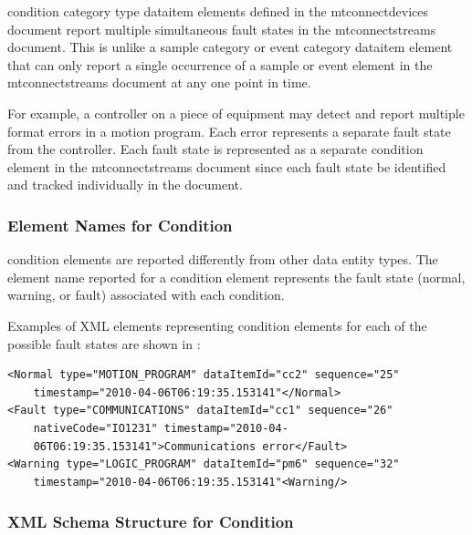 

\gls{condition category} type \gls{dataitem} elements defined in the \gls{mtconnectdevices} document \may report multiple simultaneous \glspl{fault state} in the \gls{mtconnectstreams} document.  This is unlike a \gls{sample category} or \gls{event category} \gls{dataitem} element that can only report a single occurrence of a \gls{sample} or \gls{event} element in the \gls{mtconnectstreams} document at any one point in time.

For example, a controller on a piece of equipment may detect and report multiple format errors in a motion program.   Each error represents a separate \gls{fault state} from the controller.   Each \gls{fault state} is represented as a separate \gls{condition} element in the \gls{mtconnectstreams} document since each \gls{fault state} \must be identified and tracked individually in the document.

\subsubsection{Element Names for Condition}\label{sec:Element Names for Condition}

\gls{condition} elements are reported differently from other \gls{data entity} \glspl{type}.  The \gls{element name} reported for a \gls{condition} element represents the \gls{fault state} (\gls{normal}, \gls{warning}, or \gls{fault}) associated with each \gls{condition}.

Examples of XML elements representing \gls{condition} elements for each of the possible \glspl{fault state} are shown in :

\begin{lstlisting}[firstnumber=1,escapechar=|,%
    caption={Example of Condition Element Fault States},label={lst:example-of-condition-element-fault-states}]
<Normal type="MOTION_PROGRAM" dataItemId="cc2" sequence="25"
    timestamp="2010-04-06T06:19:35.153141"</Normal>
<Fault type="COMMUNICATIONS" dataItemId="cc1" sequence="26"
    nativeCode="IO1231" timestamp="2010-04-
    06T06:19:35.153141">Communications error</Fault>
<Warning type="LOGIC_PROGRAM" dataItemId="pm6" sequence="32"
    timestamp="2010-04-06T06:19:35.153141"<Warning/>
\end{lstlisting}

\subsubsection{XML Schema Structure for Condition}


